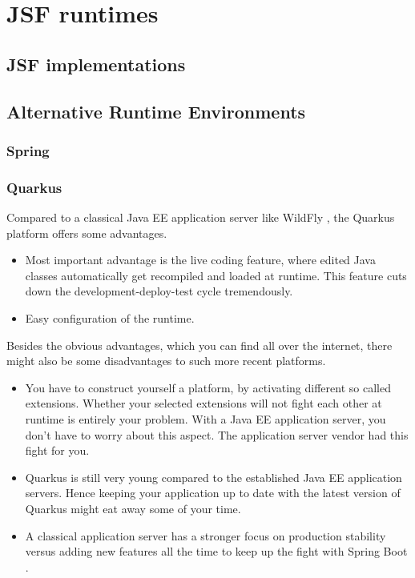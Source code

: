 %

\chapter{JSF runtimes}

\section{JSF implementations}

\section{Alternative Runtime Environments}

\subsection{Spring}

\subsection{Quarkus}

Compared to a classical Java EE application server like WildFly \cite{WildFly}, the Quarkus \cite{quarkus} platform offers some advantages.
\begin{itemize}
	\item Most important advantage is the live coding feature, where edited Java classes automatically get recompiled and loaded at runtime.
	This feature cuts down the development-deploy-test cycle tremendously.
	\item Easy configuration of the runtime.
\end{itemize}
Besides the obvious advantages, which you can find all over the internet, there might also be some disadvantages to such more recent platforms.
\begin{itemize}
	\item You have to construct yourself a platform, by activating different so called extensions.
	Whether your selected extensions will not fight each other at runtime is entirely your problem.
	With a Java EE application server, you don't have to worry about this aspect.
	The application server vendor had this fight for you.
	\item Quarkus is still very young compared to the established Java EE application servers.
	Hence keeping your application up to date with the latest version of Quarkus might eat away some of your time.
	\item A classical application server has a stronger focus on production stability versus adding new features all the time to keep up the fight with Spring Boot \cite{spring}.
\end{itemize}

